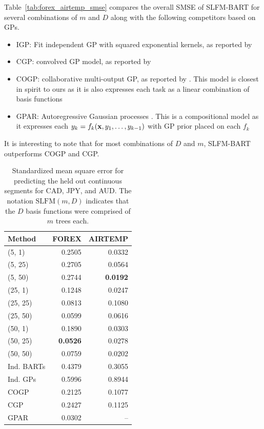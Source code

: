 \documentclass[12pt]{article}
\begin{document}
Table~\ref{tab:forex_airtemp_smse} compares the overall SMSE of SLFM-BART for several combinations of $m$ and $D$ along with the following competitors based on GPs.
\begin{itemize}
\item{IGP: Fit independent GP with squared exponential kernels, as reported by \citet{Nguyen2014}}
\item{CGP: convolved GP model, as reported by \citet{Nguyen2014}}
\item{COGP: collaborative multi-output GP, as reported by \citet{Nguyen2014}. This model is closest in spirit to ours as it is also expresses each task as a linear combination of basis functions}
\item{GPAR: Autoregressive Gaussian processes \citep{Requeima2019}. This is a compositional model as it expresses each $y_{k} = f_{k}(\mathbf{x}, y_{1}, \ldots, y_{k-1})$ with GP prior placed on each $f_{k}$}
\end{itemize} 
It is interesting to note that for most combinations of $D$ and $m$, SLFM-BART outperforms COGP and CGP.

\begin{table}[H]
\centering
\caption{Standardized mean square error for predicting the held out continuous segments for CAD, JPY, and AUD. The notation $\text{SLFM}(m,D)$ indicates that the $D$ basis functions were comprised of $m$ trees each.}
\label{tab:forex_smse}
\small
\begin{tabular}{lrr} \hline
Method & FOREX & AIRTEMP\\ \hline
(5, 1) & 0.2505 & 0.0332 \\
(5, 25) & 0.2705 & 0.0564 \\
(5, 50) & 0.2744 & \textbf{0.0192} \\
(25, 1) & 0.1248 & 0.0247 \\
(25, 25) & 0.0813 & 0.1080 \\
(25, 50) & 0.0599 & 0.0616 \\
(50, 1) & 0.1890 & 0.0303 \\
(50, 25) & \textbf{0.0526} & 0.0278 \\
(50, 50) & 0.0759 & 0.0202 \\ \hline
Ind. BARTs & 0.4379 & 0.3055 \\
Ind. GPs & 0.5996 & 0.8944 \\
COGP & 0.2125 & 0.1077 \\
CGP & 0.2427 & 0.1125 \\
GPAR & 0.0302 & -- \\ \hline
\end{tabular}
\end{table}
\end{document}
